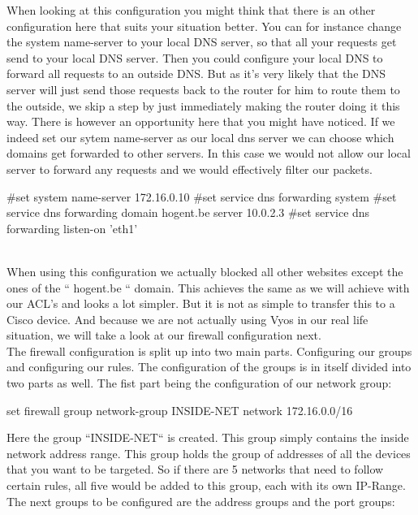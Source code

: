 When looking at this configuration you might think that there is an other configuration here that suits your situation better. You can for instance change the system name-server to your local DNS server, so that all your requests get send to your local DNS server. Then you could configure your local DNS to forward all requests to an outside DNS. But as it's very likely that the DNS server will just send those requests back to the router for him to route them to the outside, we skip a step by just immediately making the router doing it this way. There is however an opportunity here that you might have noticed. If we indeed set our sytem name-server as our local dns server we can choose which domains get forwarded to other servers. In this case we would not allow our local server to forward any requests and we would effectively filter our packets.
\begin{cisco}[title=Filtering using DNS forwarding]
#set system name-server 172.16.0.10
#set service dns forwarding system
#set service dns forwarding domain hogent.be server 10.0.2.3
#set service dns forwarding listen-on 'eth1'
\end{cisco}\\
When using this configuration we actually blocked all other websites except the ones of the `` hogent.be `` domain. This achieves the same as we will achieve with our ACL's and looks a lot simpler. But it is not as simple to transfer this to a Cisco device. And because we are not actually using Vyos in our real life situation, we will take a look at our firewall configuration next.\\
The firewall configuration is split up into two main parts. Configuring our groups and configuring our rules. The configuration of the groups is in itself divided into two parts as well. The fist part being the configuration of our network group:\\
\begin{cisco}[title=network group configuration]
set firewall group network-group INSIDE-NET network 172.16.0.0/16
\end{cisco}
Here the group ``INSIDE-NET`` is created. This group simply contains the inside network address range. This group holds the group of addresses of all the devices that you want to be targeted. So if there are 5 networks that need to follow certain rules, all five would be added to this group, each with its own IP-Range.\\
The next groups to be configured are the address groups and the port groups:\\
